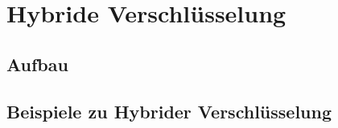 
\chapter{Hybride Verschlüsselung} %

\label{ch:mathtest} %


\section{Aufbau}

\section{Beispiele zu Hybrider Verschlüsselung}

